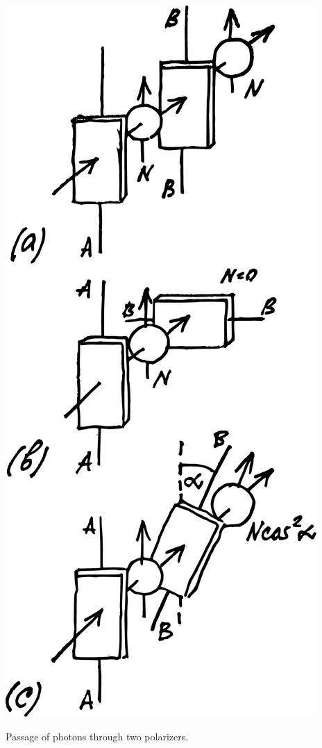 \documentclass[a4paper,sfsidenotes,colorlinks=true]{tufte-book}
\numberwithin{equation}{section}
\numberwithin{figure}{section}
\begin{document}
\begin{marginfigure}[1cm]
\centering
\includegraphics[width=\textwidth]{figures/fig-07-05.pdf}
\caption{Passage of photons through two polarizers.}
\label{fig-7.5}
\end{marginfigure}
\end{document}
